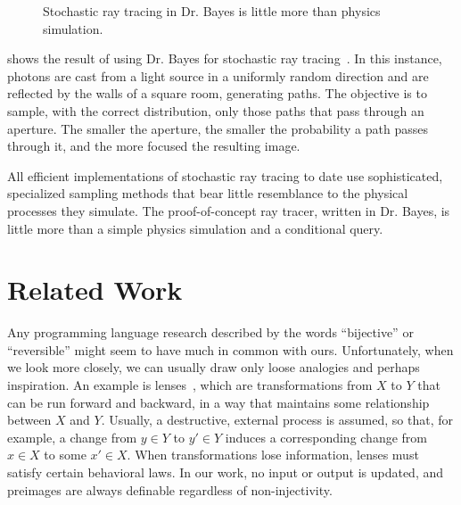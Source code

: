 \begin{figure}[!tb]
\caption[Stochastic ray tracing in Dr. Bayes]{Stochastic ray tracing in Dr. Bayes is little more than physics simulation.}
\label{fig:ray-tracing}
\end{figure}

 shows the result of using Dr. Bayes for stochastic ray tracing~\cite{cit:veach-1997siggraph-mlt}.
In this instance, photons are cast from a light source in a uniformly random direction and are reflected by the walls of a square room, generating paths.
The objective is to sample, with the correct distribution, only those paths that pass through an aperture.
The smaller the aperture, the smaller the probability a path passes through it, and the more focused the resulting image.

All efficient implementations of stochastic ray tracing to date use sophisticated, specialized sampling methods that bear little resemblance to the physical processes they simulate.
The proof-of-concept ray tracer, written in Dr. Bayes, is little more than a simple physics simulation and a conditional query.



\section{Related Work}

Any programming language research described by the words ``bijective'' or ``reversible'' might seem to have much in common with ours.
Unfortunately, when we look more closely, we can usually draw only loose analogies and perhaps inspiration.
An example is lenses~\cite{cit:hofmann-2012popl-edit-lenses}, which are transformations from $X$ to $Y$ that can be run forward and backward, in a way that maintains some relationship between $X$ and $Y$.
Usually, a destructive, external process is assumed, so that, for example, a change from $y \in Y$ to $y' \in Y$ induces a corresponding change from $x \in X$ to some $x' \in X$.
When transformations lose information, lenses must satisfy certain behavioral laws.
In our work, no input or output is updated, and preimages are always definable regardless of non-injectivity.

